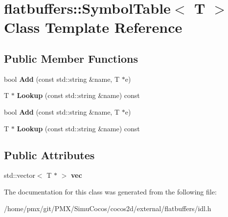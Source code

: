 \hypertarget{classflatbuffers_1_1SymbolTable}{}\section{flatbuffers\+:\+:Symbol\+Table$<$ T $>$ Class Template Reference}
\label{classflatbuffers_1_1SymbolTable}
\subsection*{Public Member Functions}
\begin{DoxyCompactItemize}
\item 
\mbox{\label{classflatbuffers_1_1SymbolTable_a99830f908467e0351167d38a17630880}} 
bool {\bfseries Add} (const std\+::string \&name, T $\ast$e)
\item 
\mbox{\label{classflatbuffers_1_1SymbolTable_aee2c0d1edd1644321b5bcc1b219dc27d}} 
T $\ast$ {\bfseries Lookup} (const std\+::string \&name) const
\item 
\mbox{\label{classflatbuffers_1_1SymbolTable_a99830f908467e0351167d38a17630880}} 
bool {\bfseries Add} (const std\+::string \&name, T $\ast$e)
\item 
\mbox{\label{classflatbuffers_1_1SymbolTable_aee2c0d1edd1644321b5bcc1b219dc27d}} 
T $\ast$ {\bfseries Lookup} (const std\+::string \&name) const
\end{DoxyCompactItemize}
\subsection*{Public Attributes}
\begin{DoxyCompactItemize}
\item 
\mbox{\label{classflatbuffers_1_1SymbolTable_a6e4885f703294d73c8d94567dc8c8f95}} 
std\+::vector$<$ T $\ast$ $>$ {\bfseries vec}
\end{DoxyCompactItemize}


The documentation for this class was generated from the following file\+:\begin{DoxyCompactItemize}
\item 
/home/pmx/git/\+P\+M\+X/\+Simu\+Cocos/cocos2d/external/flatbuffers/idl.\+h\end{DoxyCompactItemize}
